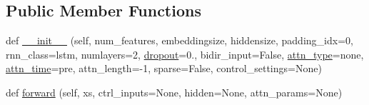 \subsection*{Public Member Functions}
\begin{DoxyCompactItemize}
\item 
def \hyperlink{classprojects_1_1controllable__dialogue_1_1controllable__seq2seq_1_1modules_1_1RNNDecoder_a04d7bdf9e34de440eeaf2c1c9c127937}{\+\_\+\+\_\+init\+\_\+\+\_\+} (self, num\+\_\+features, embeddingsize, hiddensize, padding\+\_\+idx=0, rnn\+\_\+class=\textquotesingle{}lstm\textquotesingle{}, numlayers=2, \hyperlink{classprojects_1_1controllable__dialogue_1_1controllable__seq2seq_1_1modules_1_1RNNDecoder_a15066218704d830955daf5172ac26701}{dropout}=0., bidir\+\_\+input=False, \hyperlink{classprojects_1_1controllable__dialogue_1_1controllable__seq2seq_1_1modules_1_1RNNDecoder_a2f0dcf7e68029eab9e2d67336aee861f}{attn\+\_\+type}=\textquotesingle{}none\textquotesingle{}, \hyperlink{classprojects_1_1controllable__dialogue_1_1controllable__seq2seq_1_1modules_1_1RNNDecoder_a96bf4b50c8f4532bd1d4ea921556a51a}{attn\+\_\+time}=\textquotesingle{}pre\textquotesingle{}, attn\+\_\+length=-\/1, sparse=False, control\+\_\+settings=None)
\item 
def \hyperlink{classprojects_1_1controllable__dialogue_1_1controllable__seq2seq_1_1modules_1_1RNNDecoder_acfba6f98c3a1b7a9bd95981a8b5b79a5}{forward} (self, xs, ctrl\+\_\+inputs=None, hidden=None, attn\+\_\+params=None)
\end{DoxyCompactItemize}
